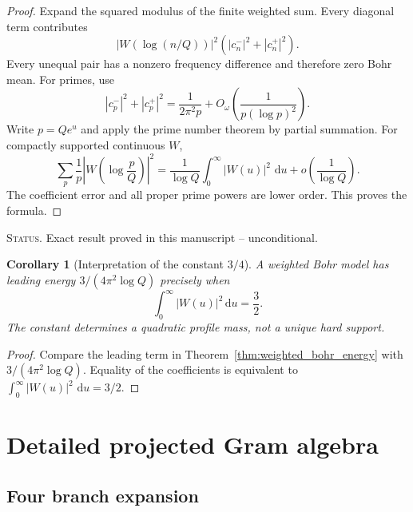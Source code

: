 \documentclass[11pt]{amsart}
\numberwithin{equation}{section}
\theoremstyle{plain}
\newtheorem{corollary}[theorem]{Corollary}
\theoremstyle{definition}
\theoremstyle{remark}
\newcommand{\1}{\mathbf{1}}
\newcommand{\dd}{\,\mathrm{d}}
\newcommand{\statusnote}[1]{%
  \par\smallskip\noindent
  \begingroup\footnotesize\textsc{Status.} #1\endgroup
  \par\smallskip}
\begin{document}
\begin{proof}
Expand the squared modulus of the finite weighted sum.  Every diagonal term
contributes
\begin{equation}
|W(\log(n/Q))|^2
\left(|c_n^-|^2+|c_n^+|^2\right).
\label{eq:weighted_bohr_diagonal}
\end{equation}
Every unequal pair has a nonzero frequency difference and therefore zero
Bohr mean.  For primes, use
\begin{equation}
|c_p^-|^2+|c_p^+|^2
=
\frac1{2\pi^2p}
+
O_\omega\left(\frac1{p(\log p)^2}\right).
\label{eq:weighted_bohr_prime_coeff}
\end{equation}
Write \(p=Qe^u\) and apply the prime number theorem by partial summation.
For compactly supported continuous \(W\),
\begin{equation}
\sum_p\frac1p
\left|W\!\left(\log\frac pQ\right)\right|^2
=
\frac1{\log Q}
\int_0^\infty|W(u)|^2\,\dd u
+
o\left(\frac1{\log Q}\right).
\label{eq:weighted_bohr_pnt}
\end{equation}
The coefficient error and all proper prime powers are lower order.  This
proves the formula.
\end{proof}

\statusnote{Exact result proved in this manuscript -- unconditional.}
\begin{corollary}[Interpretation of the constant \(3/4\)]
\label{cor:three_quarter_profile_mass}
A weighted Bohr model has leading energy
$3/(4\pi^2\log Q)$ precisely when
\begin{equation}
\int_0^\infty|W(u)|^2\dd u
=
\frac32.
\label{eq:profile_mass_three_half}
\end{equation}
The constant determines a quadratic profile mass, not a unique hard support.
\end{corollary}

\begin{proof}
Compare the leading term in
Theorem~\ref{thm:weighted_bohr_energy} with
\(3/(4\pi^2\log Q)\).  Equality of the coefficients is equivalent to
\(\int_0^\infty|W(u)|^2\,\dd u=3/2\).
\end{proof}

\section{Detailed projected Gram algebra}
\label{sec:detailed_gram_algebra}

\subsection{Four branch expansion}
\label{subsec:four_branch_expansion}
\end{document}
